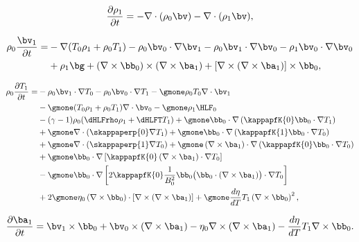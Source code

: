 {\customEquationFont

\begin{equation} \label{eq: linearised_continuity}
  \frac{\partial \rho_1}{\partial t} = -\nabla \cdot (\rho_0 \bv) - \nabla \cdot (\rho_1 \bv),
\end{equation}

\begin{equation} \label{eq: linearised_momentum}
  \begin{aligned}
    \rho_0\frac{\bv_1}{\partial t} =&
      -\nabla(T_0\rho_1 + \rho_0 T_1)
      - \rho_0 \bv_0 \cdot \nabla\bv_1
      - \rho_0\bv_1 \cdot \nabla \bv_0
      - \rho_1 \bv_0 \cdot \nabla \bv_0 \\
      \quad&
      + \rho_1 \bg
      + (\nabla \times \bb_0) \times (\nabla \times \ba_1)
      + [\nabla \times (\nabla \times \ba_1)] \times \bb_0,
  \end{aligned}
\end{equation}

\begin{equation} \label{eq: linearised_energy}
  \begin{aligned}
    \rho_0\frac{\partial T_1}{\partial t} =&
      - \rho_0\bv_1 \cdot \nabla T_0
      - \rho_0 \bv_0 \cdot \nabla T_1
      - \gmone\rho_0 T_0 \nabla \cdot \bv_1 \\
      \quad&
      - \gmone(T_0 \rho_1 + \rho_0 T_1)\nabla \cdot \bv_0
      - \gmone\rho_1 \HLF_0 \\
      \quad&
      - (\gamma - 1)\rho_0(\dHLFrho \rho_1 + \dHLFT T_1)
      + \gmone \bb_0 \cdot \nabla\left(\kappapfK{0}\bb_0 \cdot \nabla T_1 \right) \\
      \quad&
      + \gmone \nabla \cdot \left(\skappaperp{0}\nabla T_1\right)
      + \gmone \bb_0 \cdot \nabla \left(\kappapfK{1} \bb_0 \cdot \nabla T_0\right) \\
      \quad&
      + \gmone \nabla \cdot \left(\skappaperp{1} \nabla T_0\right)
      + \gmone \left(\nabla \times \ba_1\right) \cdot \nabla \left(\kappapfK{0}\bb_0 \cdot \nabla T_0\right) \\
      \quad&
      + \gmone \bb_0 \cdot \nabla \left[\kappapfK{0}\left(\nabla \times \ba_1\right) \cdot \nabla T_0\right] \\
      \quad&
      - \gmone \bb_0 \cdot \nabla \left[
        2\kappapfK{0}\frac{1}{B_0^2}\bb_0\bigl(\bb_0 \cdot \left(\nabla \times \ba_1\right)\bigr) \cdot \nabla T_0
      \right] \\
      \quad&
      + 2 \gmone \eta_0 \left(\nabla \times \bb_0\right)\cdot \left[\nabla \times \left(\nabla \times \ba_1\right)\right]
      + \gmone \frac{d\eta}{dT}T_1\left(\nabla \times \bb_0\right)^2, \\
  \end{aligned}
\end{equation}

\begin{equation} \label{eq: linearised_induction}
  \frac{\partial \ba_1}{\partial t} =
    \bv_1 \times \bb_0
    + \bv_0 \times \left(\nabla \times \ba_1\right)
    - \eta_0 \nabla \times \left(\nabla \times \ba_1\right)
    - \frac{d\eta}{dT}T_1 \nabla \times \bb_0.
\end{equation}
}


